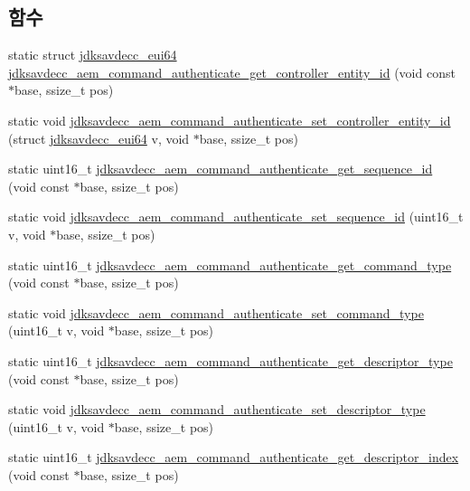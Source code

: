 \subsection*{함수}
\begin{DoxyCompactItemize}
\item 
static struct \hyperlink{structjdksavdecc__eui64}{jdksavdecc\+\_\+eui64} \hyperlink{group__command__authenticate_ga0d817f3a63a94a9e4f13071e7c299cba}{jdksavdecc\+\_\+aem\+\_\+command\+\_\+authenticate\+\_\+get\+\_\+controller\+\_\+entity\+\_\+id} (void const $\ast$base, ssize\+\_\+t pos)
\item 
static void \hyperlink{group__command__authenticate_ga8f58b0058dd6a744fc07cc8403157a71}{jdksavdecc\+\_\+aem\+\_\+command\+\_\+authenticate\+\_\+set\+\_\+controller\+\_\+entity\+\_\+id} (struct \hyperlink{structjdksavdecc__eui64}{jdksavdecc\+\_\+eui64} v, void $\ast$base, ssize\+\_\+t pos)
\item 
static uint16\+\_\+t \hyperlink{group__command__authenticate_ga61321b4eb72f8c756174fe65493e59a0}{jdksavdecc\+\_\+aem\+\_\+command\+\_\+authenticate\+\_\+get\+\_\+sequence\+\_\+id} (void const $\ast$base, ssize\+\_\+t pos)
\item 
static void \hyperlink{group__command__authenticate_gaa592e6831289bf94389392ca38a687b0}{jdksavdecc\+\_\+aem\+\_\+command\+\_\+authenticate\+\_\+set\+\_\+sequence\+\_\+id} (uint16\+\_\+t v, void $\ast$base, ssize\+\_\+t pos)
\item 
static uint16\+\_\+t \hyperlink{group__command__authenticate_ga2c74db085583504db7c2a34a76380009}{jdksavdecc\+\_\+aem\+\_\+command\+\_\+authenticate\+\_\+get\+\_\+command\+\_\+type} (void const $\ast$base, ssize\+\_\+t pos)
\item 
static void \hyperlink{group__command__authenticate_ga20e31c1cf733308d7614c902841ed5a3}{jdksavdecc\+\_\+aem\+\_\+command\+\_\+authenticate\+\_\+set\+\_\+command\+\_\+type} (uint16\+\_\+t v, void $\ast$base, ssize\+\_\+t pos)
\item 
static uint16\+\_\+t \hyperlink{group__command__authenticate_gab4d7a396b0a39e094bb57a21c5697cf0}{jdksavdecc\+\_\+aem\+\_\+command\+\_\+authenticate\+\_\+get\+\_\+descriptor\+\_\+type} (void const $\ast$base, ssize\+\_\+t pos)
\item 
static void \hyperlink{group__command__authenticate_ga482382acdfff24eaf915502ce4d5ae75}{jdksavdecc\+\_\+aem\+\_\+command\+\_\+authenticate\+\_\+set\+\_\+descriptor\+\_\+type} (uint16\+\_\+t v, void $\ast$base, ssize\+\_\+t pos)
\item 
static uint16\+\_\+t \hyperlink{group__command__authenticate_gaa20d61859334e4bf12677ccc80220622}{jdksavdecc\+\_\+aem\+\_\+command\+\_\+authenticate\+\_\+get\+\_\+descriptor\+\_\+index} (void const $\ast$base, ssize\+\_\+t pos)

\end{DoxyCompactItemize}
